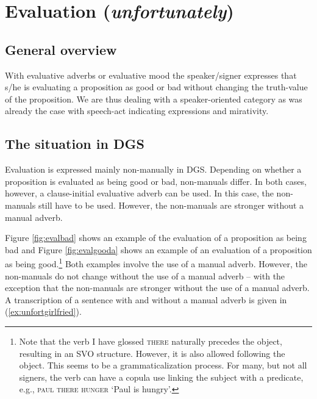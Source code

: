 \section{Evaluation (\textit{unfortunately})}\label{evalllll}

\subsection{General overview}

With evaluative adverbs or evaluative mood the speaker/signer expresses that s/he is evaluating a proposition as good or bad without changing the truth-value of the proposition. We are thus dealing with a speaker-oriented category as was already the case with speech-act indicating expressions and mirativity. 

\subsection{The situation in DGS}
Evaluation is expressed mainly non-manually in DGS. Depending on whether a proposition is evaluated as being good or bad, non-manuals differ. In both cases, however, a clause-initial evaluative adverb can be used. In this case, the non-manuals still have to be used. However, the non-manuals are stronger without a manual adverb. 

Figure \ref{fig:evalbad} shows an example of the evaluation of a proposition as being bad and Figure \ref{fig:evalgooda} shows an example of an evaluation of a proposition as being good.\footnote{ Note that the verb I have glossed \textsc{there} naturally precedes the object, resulting in an SVO structure. However, it is also allowed following the object. This seems to be a grammaticalization process. For many, but not all signers, the verb can have a copula use linking the subject with a predicate, e.g.,  \textsc{paul there hunger} `Paul is hungry'.\label{footnotecopula}} Both examples involve the use of a manual adverb. However, the non-manuals do not change without the use of a manual adverb -- with the exception that the non-manuals are stronger without the use of a manual adverb. A transcription of a sentence with and without a manual adverb is given in (\ref{ex:unfortgirlfried}).

